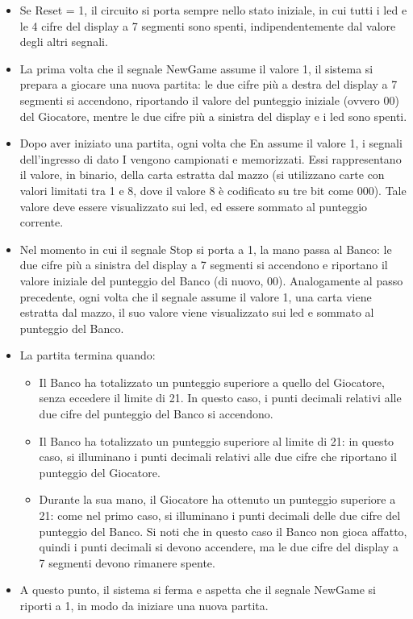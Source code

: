 \documentclass [11pt,a4paper,oneside]{article}
\begin{document}
\begin{itemize}
\item Se Reset = 1, il circuito si porta sempre nello stato iniziale, in cui tutti i led e le
      4 cifre del display a 7 segmenti sono spenti, indipendentemente dal valore
      degli altri segnali.

\item La prima volta che il segnale NewGame assume il valore 1, il sistema si
      prepara a giocare una nuova partita: le due cifre più a destra del display a 7
      segmenti si accendono, riportando il valore del punteggio iniziale (ovvero 00)
      del Giocatore, mentre le due cifre più a sinistra del display e i led sono spenti.

\item Dopo aver iniziato una partita, ogni volta che En assume il valore 1, i segnali
      dell'ingresso di dato I vengono campionati e memorizzati. Essi rappresentano
      il valore, in binario, della carta estratta dal mazzo (si utilizzano carte con valori
      limitati tra 1 e 8, dove il valore 8 è codificato su tre bit come 000). Tale valore
      deve essere visualizzato sui led, ed essere sommato al punteggio corrente.

\item Nel momento in cui il segnale Stop si porta a 1, la mano passa al Banco: le
      due cifre più a sinistra del display a 7 segmenti si accendono e riportano il
      valore iniziale del punteggio del Banco (di nuovo, 00). Analogamente al passo
      precedente, ogni volta che il segnale assume il valore 1, una carta viene
      estratta dal mazzo, il suo valore viene visualizzato sui led e sommato al
      punteggio del Banco.

\item La partita termina quando:
      \begin{itemize}
      \item Il Banco ha totalizzato un punteggio superiore a quello del Giocatore,
            senza eccedere il limite di 21. In questo caso, i punti decimali relativi
            alle due cifre del punteggio del Banco si accendono.

      \item Il Banco ha totalizzato un punteggio superiore al limite di 21: in questo
            caso, si illuminano i punti decimali relativi alle due cifre che riportano il
            punteggio del Giocatore.

      \item Durante la sua mano, il Giocatore ha ottenuto un punteggio superiore a
            21: come nel primo caso, si illuminano i punti decimali delle due cifre
            del punteggio del Banco. Si noti che in questo caso il Banco non gioca
            affatto, quindi i punti decimali si devono accendere, ma le due cifre del
            display a 7 segmenti devono rimanere spente.
      \end{itemize}

\item A questo punto, il sistema si ferma e aspetta che il segnale NewGame si riporti
      a 1, in modo da iniziare una nuova partita.
\end{itemize}
\end{document}
